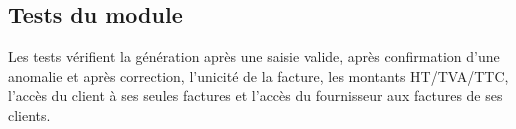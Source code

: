 \subsection{Tests du module}

Les tests vérifient la génération après une saisie valide, après confirmation d'une anomalie et après correction, l'unicité de la facture, les montants HT/TVA/TTC, l'accès du client à ses seules factures et l'accès du fournisseur aux factures de ses clients.
